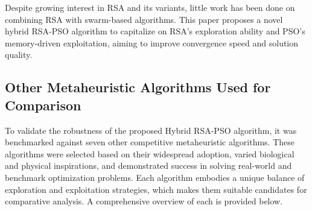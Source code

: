 \documentclass[12pt]{article}
\begin{document}
Despite growing interest in RSA and its variants, little work has been done on combining RSA with swarm-based algorithms. This paper proposes a novel hybrid RSA-PSO algorithm to capitalize on RSA’s exploration ability and PSO’s memory-driven exploitation, aiming to improve convergence speed and solution quality.

\subsection{Other Metaheuristic Algorithms Used for Comparison}
To validate the robustness of the proposed Hybrid RSA-PSO algorithm, it was benchmarked against seven other competitive metaheuristic algorithms. These algorithms were selected based on their widespread adoption, varied biological and physical inspirations, and demonstrated success in solving real-world and benchmark optimization problems. Each algorithm embodies a unique balance of exploration and exploitation strategies, which makes them suitable candidates for comparative analysis. A comprehensive overview of each is provided below.
\end{document}
